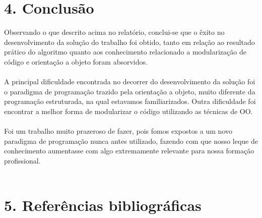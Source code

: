 \documentclass[12pt, a4paper]{article}
\begin{document}
\section*{4. Conclusão}
  Observando o que descrito acima no relatório, conclui-se que o êxito no desenvolvimento da solução do trabalho foi obtido, tanto em relação ao resultado prático do algoritmo quanto aos conhecimento relacionado a modularização de código e orientação a objeto foram absorvidos.\\\\
  A principal dificuldade encontrada no decorrer do desenvolvimento da solução foi o paradigma de programação trazido pela orientação a objeto, muito diferente da programação estruturada, na qual estavamos familiarizados. Outra dificuldade foi encontrar a melhor forma de modularizar o código utilizando as técnicas de OO.\\\\
  Foi um trabalho muito prazeroso de fazer, pois fomos expostos a um novo paradigma de programação nunca antes utilizado, fazendo com que nosso leque de conhecimento aumentasse com algo extremamente relevante para nossa formação profissional.\\\\

\section*{5. Referências bibliográficas}
\end{document}
